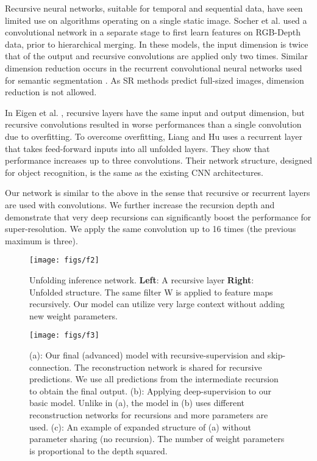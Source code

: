 \documentclass[10pt,twocolumn,letterpaper]{article}
\begin{document}
Recursive neural networks, suitable for temporal and sequential data, have seen limited use on algorithms operating on a single static image.   Socher et al.  \cite{socher2012convolutional} used a convolutional network in a separate stage to first learn features on RGB-Depth data, prior to hierarchical merging. In these models, the input dimension is twice that of the output and recursive convolutions are applied only two times. Similar dimension reduction occurs in the recurrent convolutional neural networks used for semantic segmentation \cite{pinheiro2014recurrent}. As SR methods predict full-sized images, dimension reduction is not allowed.

In Eigen et al. \cite{Eigen2014}, recursive layers have the same input and output dimension, but recursive convolutions resulted in worse performances than a single convolution due to overfitting. To overcome overfitting, Liang and Hu \cite{Liang_2015_CVPR} uses a recurrent layer that takes feed-forward inputs into all unfolded layers. They show that performance increases up to three convolutions. Their network structure, designed for object recognition, is the same as the existing CNN architectures.

Our network is similar to the above in the sense that recursive or recurrent layers are used with convolutions. We further increase the recursion depth and demonstrate that very deep recursions can significantly boost the performance for super-resolution. We apply the same convolution up to 16 times (the previous maximum is three). 

\begin{figure}[t]
	\texttt{[image: figs/f2]}
	\caption {Unfolding inference network. \textbf{Left}: A recursive layer \textbf{Right}: Unfolded structure. The same filter W is applied to feature maps recursively. Our model can utilize very large context without adding new weight parameters. }
	\label{fig:inference_network}
\end{figure}



\begin{figure*}[t]
\begin{center}
	\texttt{[image: figs/f3]}
	\caption{(a): Our final (advanced) model with recursive-supervision and skip-connection. The reconstruction network is shared for recursive predictions. We use all predictions from the intermediate recursion to obtain the final output. (b): Applying deep-supervision \cite{lee2014deeply} to our basic model. Unlike in (a), the model in (b) uses different reconstruction networks for recursions and more parameters are used.  (c): An example of expanded structure of (a) without parameter sharing (no recursion). The number of weight parameters is proportional to the depth squared. }
\label{fig:recursive_supervision}
\end{center}
\end{figure*}
\end{document}
